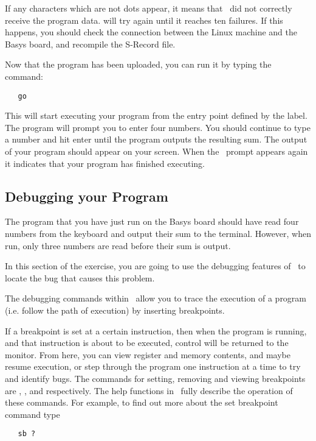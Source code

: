 If any characters which are not dots appear, it means that \WRAMPmon\ did not
correctly receive the program data.  will try again until it
reaches ten failures. If this happens, you should check the connection between
the Linux machine and the Basys board, and recompile the S-Record file.

Now that the program has been uploaded, you can run it by typing the command:
\begin{verbatim}
   go
\end{verbatim}

This will start executing your program from the entry point defined by the 
 label. The program will prompt you to enter four numbers. You
should continue to type a number and hit enter until the program outputs the
resulting sum. The output of your program should appear on your screen. When
the \WRAMPmon\ prompt appears again it indicates that your program has finished
executing.

\subsection{Debugging your Program}
\label{intro:debugging}
The program that you have just run on the Basys board should have read four
numbers from the keyboard and output their sum to the terminal. However, when
run, only three numbers are read before their sum is output.

In this section of the exercise, you are going to use the debugging 
features of \WRAMPmon\ to locate the bug that causes this problem.

The debugging commands within \WRAMPmon\ allow you to trace the execution 
of a program (i.e. follow the path of execution) by inserting breakpoints.

If a breakpoint is set at a certain instruction, then when the program
is running, and that instruction is about to be executed, control will
be returned to the monitor. From here, you can view register and
memory contents, and maybe resume execution, or step through the
program one instruction at a time to try and identify bugs. The
commands for setting, removing and viewing breakpoints are ,
, and  respectively. The help functions in \WRAMPmon\
fully describe the operation of these commands. For example, to find
out more about the set breakpoint command type
\begin{verbatim}
   sb ?
\end{verbatim}

